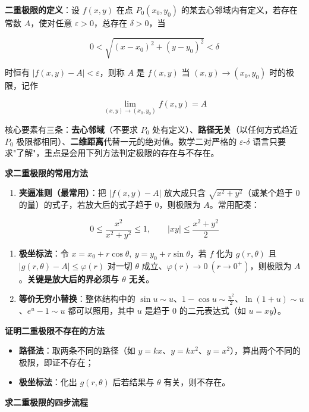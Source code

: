 \documentclass[11pt,openany,UTF8]{ctexbook}
\begin{document}
\textbf{二重极限的定义}：设 $f(x,y)$ 在点 $P_0(x_0,y_0)$ 的某去心邻域内有定义，若存在常数 $A$，使对任意 $\varepsilon>0$，总存在 $\delta>0$，当

\[0<\sqrt{(x-x_0)^{2}+(y-y_0)^{2}}<\delta\]

时恒有 $\vert f(x,y)-A\vert <\varepsilon$，则称 $A$ 是 $f(x,y)$ 当 $(x,y)\to(x_0,y_0)$ 时的极限，记作

\[\lim_{(x,y)\to(x_0,y_0)}f(x,y)=A\]

核心要素有三条：\textbf{去心邻域}（不要求 $P_0$ 处有定义）、\textbf{路径无关}（以任何方式趋近 $P_0$ 极限都相同）、\textbf{二维距离}代替一元的绝对值。数学二对严格的 $\varepsilon$-$\delta$ 语言只要求"了解"，重点是会用下列方法判定极限的存在与不存在。

\textbf{求二重极限的常用方法}

\begin{enumerate}
\item \textbf{夹逼准则（最常用）}：把 $\vert f(x,y)-A\vert$ 放大成只含 $\sqrt{x^{2}+y^{2}}$（或某个趋于 $0$ 的量）的式子，若放大后的式子趋于 $0$，则极限为 $A$。常用配凑：
\end{enumerate}
\[0\le \frac{x^{2}}{x^{2}+y^{2}}\le 1,\qquad \vert xy\vert\le \frac{x^{2}+y^{2}}{2}\]

\begin{enumerate}
\item \textbf{极坐标法}：令 $x=x_0+r\cos\theta,\ y=y_0+r\sin\theta$，若 $f$ 化为 $g(r,\theta)$ 且 $\vert g(r,\theta)-A\vert\le \varphi(r)$ 对一切 $\theta$ 成立、$\varphi(r)\to 0\ (r\to 0^{+})$，则极限为 $A$。\textbf{关键是放大后的界必须与 $\theta$ 无关}。
\item \textbf{等价无穷小替换}：整体结构中的 $\sin u\sim u$、$1-\cos u\sim \frac{u^{2}}{2}$、$\ln(1+u)\sim u$、$e^{u}-1\sim u$ 都可以照用，其中 $u$ 是趋于 $0$ 的二元表达式（如 $u=xy$）。
\end{enumerate}
\textbf{证明二重极限不存在的方法}

\begin{itemize}
\item \textbf{路径法}：取两条不同的路径（如 $y=kx$、$y=kx^{2}$、$y=x^{2}$），算出两个不同的极限，即证不存在；
\item \textbf{极坐标法}：化出 $g(r,\theta)$ 后若结果与 $\theta$ 有关，则不存在。
\end{itemize}
\textbf{求二重极限的四步流程}
\end{document}
